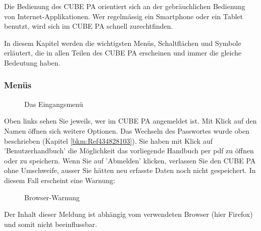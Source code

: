 Die Bedienung des CUBE PA orientiert sich an der gebräuchlichen Bedienung von Internet-Applikationen. Wer regelmässig ein Smartphone oder ein Tablet benutzt, wird sich im CUBE PA schnell zurechtfinden.

\vspace{\baselineskip}

In diesem Kapitel werden die wichtigsten Menüs, Schaltflächen und Symbole erläutert, die in allen Teilen des CUBE PA erscheinen und immer die gleiche Bedeutung haben.

\pagebreak

\subsubsection{Menüs}

\begin{figure}[H]
\caption{Das Eingangsmenü}
\end{figure}


Oben links sehen Sie jeweils, wer im CUBE PA angemeldet ist. Mit Klick auf den Namen öffnen sich weitere Optionen. Das Wechseln des Passwortes wurde oben beschrieben (Kapitel \ref{bkm:Ref434828103}). Sie haben mit Klick auf 'Benutzerhandbuch' die Möglichkeit das vorliegende Handbuch per pdf zu öffnen oder zu speichern. Wenn Sie auf 'Abmelden' klicken, verlassen Sie den CUBE PA ohne Umschweife, ausser Sie hätten neu erfasste Daten noch nicht gespeichert. In diesem Fall erscheint eine Warnung:

\begin{figure}[H]
\caption{Browser-Warnung}
\end{figure}
\begin{small}
Der Inhalt dieser Meldung ist abhängig vom verwendeten Browser (hier Firefox) und somit nicht beeinflussbar.
\end{small}

